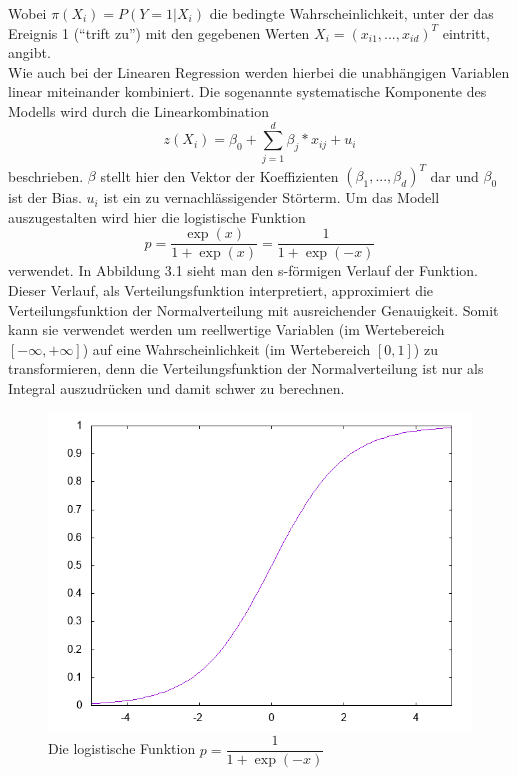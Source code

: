 Wobei $\pi(X_i)=P(Y=1|X_i)$ die bedingte Wahrscheinlichkeit, unter der das Ereignis 1 ("`trift zu"') mit den gegebenen Werten $X_i = (x_{i1},...,x_{id})^{T}$ eintritt, angibt.\\
Wie auch bei der Linearen Regression werden hierbei die unabhängigen Variablen linear miteinander kombiniert. Die sogenannte systematische Komponente des Modells wird durch die Linearkombination
\begin{displaymath}
z(X_i)=\beta_0 + \sum_{j=1}^{d}{\beta_j * x_{ij}} + u_i
\end{displaymath}
beschrieben. $\beta$ stellt hier den Vektor der Koeffizienten $(\beta_1 ,..., \beta_d)^T$ dar und $\beta_0$ ist der Bias. $u_i$ ist ein zu vernachlässigender Störterm.\cite{ROHR}
Um das Modell auszugestalten wird hier die logistische Funktion 
\begin{displaymath}
p=\dfrac{\exp(x)}{1+\exp(x)}=\dfrac{1}{1+\exp(-x)}
\end{displaymath}
verwendet.\cite{BECK}
In Abbildung 3.1 sieht man den s-förmigen Verlauf der Funktion. Dieser Verlauf, als Verteilungsfunktion interpretiert, approximiert die Verteilungsfunktion der Normalverteilung mit ausreichender Genauigkeit. Somit kann sie verwendet werden um reellwertige Variablen (im Wertebereich $[-\infty, +\infty]$) auf eine Wahrscheinlichkeit (im Wertebereich $[0,1]$) zu transformieren, denn die Verteilungsfunktion der Normalverteilung ist nur als Integral auszudrücken und damit schwer zu berechnen.\cite{WIKI}\cite{BECK}
\begin{figure}[ht]
\centering
\includegraphics[scale=0.65]{bilder/logistic_reg_func}
\caption{Die logistische Funktion $p=\dfrac{1}{1+\exp(-x)}$ }
\end{figure}
